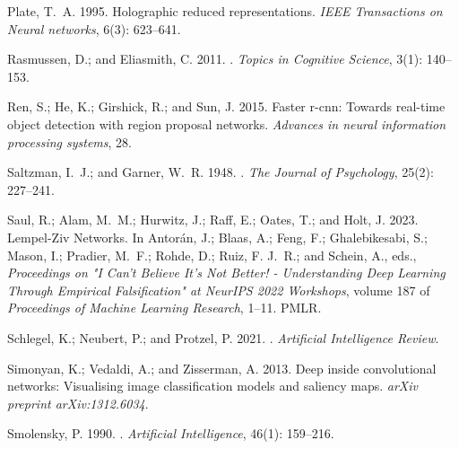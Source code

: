 \documentclass[letterpaper]{article} %
\begin{document}
\begin{thebibliography}{33}
    Plate, T.~A. 1995.
    \newblock Holographic reduced representations.
    \newblock \emph{IEEE Transactions on Neural networks}, 6(3): 623--641.

    Rasmussen, D.; and Eliasmith, C. 2011.
    .
    \newblock \emph{Topics in Cognitive Science}, 3(1): 140--153.

    Ren, S.; He, K.; Girshick, R.; and Sun, J. 2015.
    \newblock Faster r-cnn: Towards real-time object detection with region proposal
      networks.
    \newblock \emph{Advances in neural information processing systems}, 28.

    Saltzman, I.~J.; and Garner, W.~R. 1948.
    .
    \newblock \emph{The Journal of Psychology}, 25(2): 227--241.

    Saul, R.; Alam, M.~M.; Hurwitz, J.; Raff, E.; Oates, T.; and Holt, J. 2023.
    \newblock Lempel-Ziv Networks.
    \newblock In Antorán, J.; Blaas, A.; Feng, F.; Ghalebikesabi, S.; Mason, I.;
      Pradier, M.~F.; Rohde, D.; Ruiz, F. J.~R.; and Schein, A., eds.,
      \emph{Proceedings on "I Can't Believe It's Not Better! - Understanding Deep
      Learning Through Empirical Falsification" at NeurIPS 2022 Workshops}, volume
      187 of \emph{Proceedings of Machine Learning Research}, 1--11. PMLR.

    Schlegel, K.; Neubert, P.; and Protzel, P. 2021.
    .
    \newblock \emph{Artificial Intelligence Review}.

    Simonyan, K.; Vedaldi, A.; and Zisserman, A. 2013.
    \newblock Deep inside convolutional networks: Visualising image classification
      models and saliency maps.
    \newblock \emph{arXiv preprint arXiv:1312.6034}.

    Smolensky, P. 1990.
    .
    \newblock \emph{Artificial Intelligence}, 46(1): 159--216.


\end{thebibliography}
\end{document}
